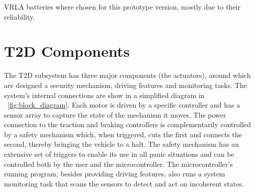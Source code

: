 \documentclass[journal]{IEEEtran}
\begin{document}
    \ac{VRLA} batteries where chosen for this prototype version, mostly due to their reliability.



% 




%
%

\section{T2D Components}

The \ac{T2D} subsystem has three major components (the actuators), around which are designed a security mechanism, driving features and monitoring tasks. The system's internal connections are show in a simplified diagram in \figurename~\ref{fig:block_diagram}. Each motor is driven by a specific controller and has a sensor array to capture the state of the mechanism it moves. The power connection to the traction and braking controllers is complementarily controlled by a safety mechanism which, when triggered, cuts the first and connects the second, thereby bringing the vehicle to a halt. The safety mechanism has an extensive set of triggers to enable its use in all panic situations and can be controlled both by the user and the microcontroller. The microcontroller's running program, besides providing driving features, also runs a system monitoring task that scans the sensors to detect and act on incoherent states.
\end{document}
